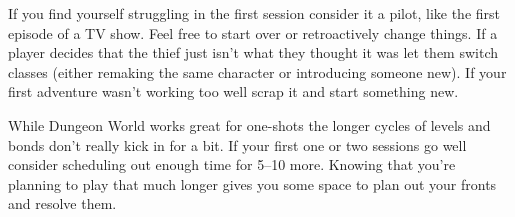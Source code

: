 If you find yourself struggling in the first session consider it a pilot, like the first episode of a TV show. Feel free to start over or retroactively change things. If a player decides that the thief just isn't what they thought it was let them switch classes (either remaking the same character or introducing someone new). If your first adventure wasn't working too well scrap it and start something new.


 While Dungeon World works great for one-shots the longer cycles of levels and bonds don't really kick in for a bit. If your first one or two sessions go well consider scheduling out enough time for 5--10 more. Knowing that you're planning to play that much longer gives you some space to plan out your fronts and resolve them.


